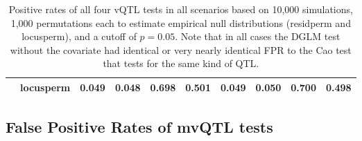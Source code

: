 \begin{table}[ht]
\begin{tabular}{lll llll lll}
           & locusperm & 0.049 & 0.048 & 0.698 & 0.501 & 0.049 & 0.050 & 0.700 & 0.498 \\ 
        \hline
      \end{tabular}
      \caption[
        Positive rates of vQTL tests in extended scenarios.
      ]
      {
        Positive rates of all four vQTL tests in all scenarios based on 10,000 simulations, 1,000 permutations each to estimate empirical null distributions (residperm and locusperm), and a cutoff of $p = 0.05$.
        Note that in all cases the DGLM test without the covariate had identical or very nearly identical FPR to the Cao test that tests for the same kind of QTL.
      }
      \label{tab:vqtl_fpr}
  \end{table}



\FloatBarrier
\clearpage
\subsection{False Positive Rates of mvQTL tests}

  \renewcommand{\arraystretch}{1.0}

